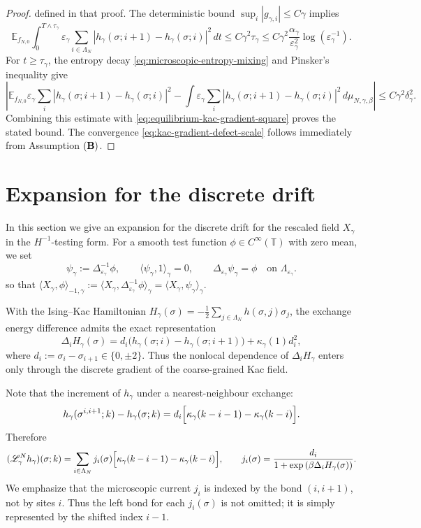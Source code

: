 \documentclass{article}
\begin{document}
\begin{proof}
defined in that proof.  The deterministic bound
\(\sup_i|g_{\gamma,i}|\le C\gamma\) implies
\[
\mathbb E_{f_{N,0}}
\int_0^{T\wedge\tau_\gamma}
\varepsilon_\gamma\sum_{i \in \Lambda_N} |h_\gamma(\sigma;i+1)-h_\gamma(\sigma;i)|^2\,dt
\le
C\gamma^2\tau_\gamma
\le
C\gamma^2\frac{\alpha_\gamma}{\varepsilon_\gamma^2}
\log(\varepsilon_\gamma^{-1}).
\]
For \(t\ge\tau_\gamma\), the entropy decay
\eqref{eq:microscopic-entropy-mixing} and Pinsker's inequality give
\[
\left|
\mathbb E_{f_{N,0}}
\varepsilon_\gamma\sum_i |h_\gamma(\sigma;i+1)-h_\gamma(\sigma;i)|^2
-
\int\varepsilon_\gamma\sum_i |h_\gamma(\sigma;i+1)-h_\gamma(\sigma;i)|^2\,
d\mu_{N,\gamma,\beta}
\right|
\le C\gamma^2\delta_\gamma^2 .
\]
Combining this estimate with
\eqref{eq:equilibrium-kac-gradient-square} proves the stated bound.  The
convergence \eqref{eq:kac-gradient-defect-scale} follows immediately from
Assumption \(({\bf B})\).
\end{proof}
\section{Expansion for the discrete drift}\label{sec:current}

In this section we give an expansion for the discrete drift for the rescaled field $X_\gamma$ in the \(H^{-1}\)-testing form.
For a smooth test function \(\phi\in C^\infty(\mathbb T)\) with zero mean, we set
\[
\psi_\gamma:=\Delta_{\varepsilon_\gamma}^{-1}\phi,
\qquad
\langle\psi_\gamma,1\rangle_\gamma=0,
\qquad
\Delta_{\varepsilon_\gamma}\psi_\gamma=\phi
\quad\text{on }\Lambda_{\varepsilon_\gamma}.
\]
so that
\(
\langle X_\gamma,\phi\rangle_{-1,\gamma}
:=
\langle X_\gamma,\Delta_{\varepsilon_\gamma}^{-1}\phi\rangle_\gamma
=
\langle X_\gamma,\psi_\gamma\rangle_\gamma .
\)

With the Ising–Kac Hamiltonian $H_\gamma(\sigma)= -\frac12\sum_{j \in \Lambda_N } h(\sigma, j)\sigma_j$,
the exchange energy difference admits the exact representation
\[
\Delta_i H_\gamma(\sigma)
=
d_i\bigl(h_\gamma(\sigma;i)-h_\gamma(\sigma;i+1)\bigr) + \kappa_\gamma(1)d^2_i,
\]
where $d_i:=\sigma_i-\sigma_{i+1}\in\{0,\pm2\}$.
Thus the nonlocal dependence of \(\Delta_i H_\gamma\) enters only through the discrete gradient of the coarse-grained Kac field.

Note that the increment of \(h_\gamma\) under a nearest-neighbour exchange:
\begin{equation}\label{Ex:h}
    h_\gamma(\sigma^{i,i+1};k)-h_\gamma(\sigma;k)
=
d_i\Bigl[\kappa_\gamma(k-i-1)-\kappa_\gamma(k-i)\Bigr].
\end{equation}
Therefore
\[
(\mathscr L_\gamma^{N} h_\gamma)(\sigma;k)
=
\sum_{i\in\Lambda_N}
j_i(\sigma)\Bigl[\kappa_\gamma(k-i-1)-\kappa_\gamma(k-i)\Bigr],
\qquad j_i(\sigma)= \frac{d_i}{1 + \exp{(\beta\Delta_i H_\gamma (\sigma))}}.
\]
We emphasize that the microscopic current $j_i$ is indexed by the bond $(i,i+1)$, not by sites $i$.
Thus the left bond for each $j_i(\sigma)$ is not omitted; it is simply represented by the shifted index \(i-1\).
\end{document}
